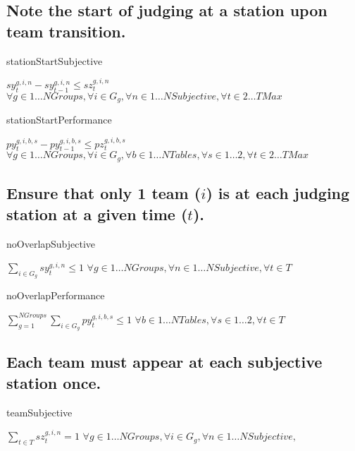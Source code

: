 \documentclass[letterpaper,11pt]{report}
\begin{document}
\FloatBarrier
\subsection{Note the start of judging at a station upon team transition.}
\begin{algorithm}
\caption{stationStartSubjective}
$sy_{t}^{g,i,n} - sy_{t-1}^{g,i,n} \le sz_{t}^{g,i,n}$
\hfill $
\forall g \in 1 \dots NGroups,
\forall i \in G_{g},
\forall n \in 1 \dots NSubjective,
\forall t \in {2 \dots TMax}
$
\end{algorithm}

\begin{algorithm}
\caption{stationStartPerformance}
$py_{t}^{g,i,b,s} - py_{t-1}^{g,i,b,s} \le pz_{t}^{g,i,b,s}$
\hfill $
\forall g \in 1 \dots NGroups,
\forall i \in G_{g},
\forall b \in {1 \dots NTables},
\forall s \in 1 \dots 2,
\forall t \in {2 \dots TMax}
$
\end{algorithm}


\FloatBarrier
\subsection{Ensure that only 1 team ($i$) is at each judging station at a
given time ($t$).}
\label{judging_group_constraint}

\begin{algorithm}
\caption{noOverlapSubjective}
$\sum\limits_{i \in G_{g}} sy_{t}^{g,i,n} \le 1$          
\hfill $
\forall g \in 1 \dots NGroups,
\forall n \in 1 \dots NSubjective,
\forall t \in T
$
\end{algorithm}

\begin{algorithm}
\caption{noOverlapPerformance}
$\sum\limits_{g=1}^{NGroups} \sum\limits_{i \in G_{g}} py_{t}^{g,i,b,s} \le 1$
\hfill $
\forall b \in 1 \dots NTables,
\forall s \in 1 \dots 2,
\forall t \in T
$
\end{algorithm}


\FloatBarrier
\subsection{Each team must appear at each subjective station once.}

\begin{algorithm}
\caption{teamSubjective}
$\sum\limits_{t \in T} sz_{t}^{g,i,n} = 1$
\hfill $
\forall g \in 1 \dots NGroups,
\forall i \in G_{g},
\forall n \in 1 \dots NSubjective,
$
\end{algorithm}
\end{document}
